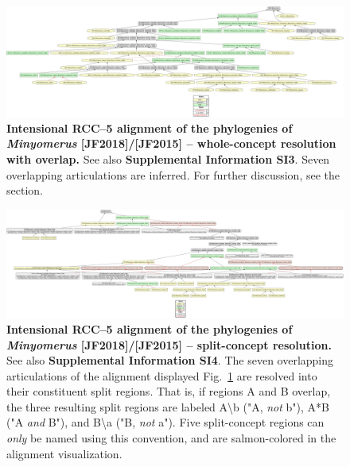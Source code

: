 \documentclass[fleqn,10pt,lineno]{wlpeerj} %
\begin{document}
\begin{figure}[h]
	\centering
	\includegraphics[width=\textwidth]{figure2.png}
	\caption{\textbf{Intensional RCC--5 alignment of the phylogenies of \textit{Minyomerus} [JF2018]/[JF2015] -- whole-concept resolution with overlap.} See also \textbf{Supplemental Information SI3}. Seven overlapping articulations are inferred. For further discussion, see the \textbf{} section.}
	\label{fig:align2}
\end{figure}

\begin{figure}[h]
	\centering
	\includegraphics[width=\textwidth]{figure3.png}
	\caption{\textbf{Intensional RCC--5 alignment of the phylogenies of \textit{Minyomerus} [JF2018]/[JF2015] -- split-concept resolution.} See also \textbf{Supplemental Information SI4}. The seven overlapping articulations of the alignment displayed Fig.~\ref{fig:align2} are resolved into their constituent split regions. That is, if regions A and B overlap, the three resulting split regions are labeled A\textbackslash b ("A, \emph{not} b"), A*B ("A \emph{and} B"), and B\textbackslash a ("B, \emph{not} a"). Five split-concept regions can \emph{only} be named using this convention, and are salmon-colored in the alignment visualization.}
	\label{fig:align3}
\end{figure}
\end{document}
